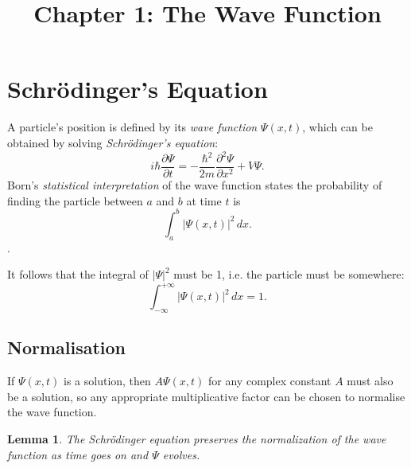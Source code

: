 \documentclass{article}
\newtheorem*{lemma*}{Lemma}
\begin{document}
\title{Chapter 1: The Wave Function}
\maketitle

\section{Schr\"{o}dinger's Equation}

A particle's position is defined by its \emph{wave function} $\Psi(x, t)$,
which can be obtained by solving \emph{Schr\"{o}dinger's equation}:
\begin{equation}
  i\hbar\frac{\partial \Psi}{\partial t} = -\frac{\hbar^2}{2m}
  \frac{\partial^2 \Psi}{\partial x^2} + V\Psi. \label{eq:sch-eqn}
\end{equation}
Born's \emph{statistical interpretation} of the wave function states the
probability of finding the particle between $a$ and $b$ at time $t$ is \[
\int_a^b |\Psi(x, t)|^2 \,dx. \].

It follows that the integral of $|\Psi|^2$ must be 1, i.e. the particle must be
somewhere:
\begin{equation}
  \int_{-\infty}^{+\infty} |\Psi(x, t)|^2 \,dx = 1. \label{eq:sch-prob}
\end{equation}

\subsection{Normalisation}

If $\Psi(x, t)$ is a solution, then $A\Psi(x, t)$ for any complex constant $A$
must also be a solution, so any appropriate multiplicative factor can be chosen
to normalise the wave function.

\begin{lemma*}
  The Schr\"{o}dinger equation preserves the normalization of the wave function
  as time goes on and $\Psi$ evolves.
\end{lemma*}
\end{document}
